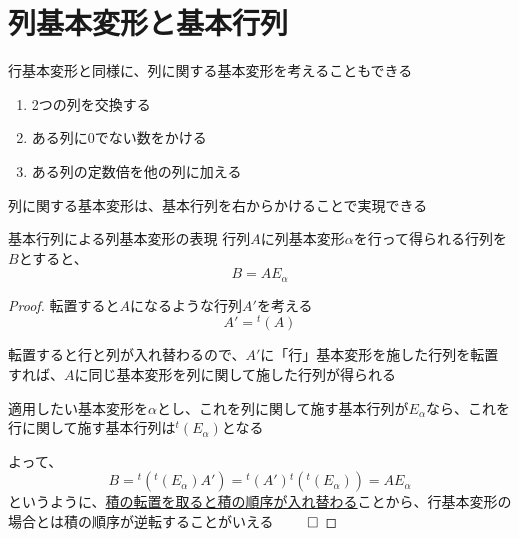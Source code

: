 \documentclass[../../../topic_linear-algebra]{subfiles}
\begin{document}
\sectionline
\section{列基本変形と基本行列}

行基本変形と同様に、列に関する基本変形を考えることもできる

\begin{enumerate}[label=\romanlabel]
  \item 2つの列を交換する
  \item ある列に0でない数をかける
  \item ある列の定数倍を他の列に加える
\end{enumerate}

列に関する基本変形は、基本行列を右からかけることで実現できる

\begin{theorem}{基本行列による列基本変形の表現}
  行列$A$に列基本変形$\alpha$を行って得られる行列を$B$とすると、
  \begin{equation*}
    B = A E_\alpha
  \end{equation*}
\end{theorem}

\begin{proof}
  転置すると$A$になるような行列$A'$を考える
  \begin{equation*}
    A' = {}^t(A)
  \end{equation*}

  転置すると行と列が入れ替わるので、$A'$に「行」基本変形を施した行列を転置すれば、$A$に同じ基本変形を列に関して施した行列が得られる

  \br

  適用したい基本変形を$\alpha$とし、これを列に関して施す基本行列が$E_\alpha$なら、これを行に関して施す基本行列は${}^t(E_\alpha)$となる

  \br

  よって、
  \begin{equation*}
    B = {}^t({}^t(E_\alpha)A') = {}^t(A'){}^t({}^t(E_\alpha))  = AE_{\alpha}
  \end{equation*}
  というように、\hyperref[thm:transpose-of-product]{積の転置を取ると積の順序が入れ替わる}ことから、行基本変形の場合とは積の順序が逆転することがいえる $\qed$
\end{proof}
\end{document}
